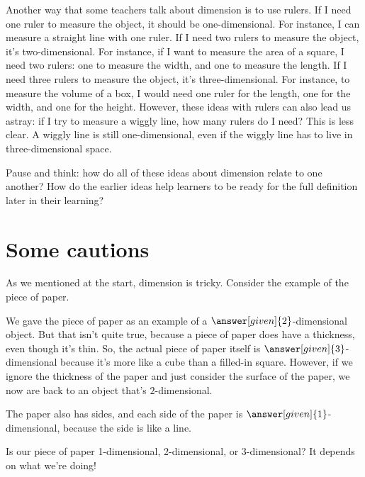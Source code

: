 \documentclass{ximera}
\begin{document}
Another way that some teachers talk about dimension is to use rulers. If I need one ruler to measure the object, it should be one-dimensional. For instance, I can measure a straight line with one ruler. If I need two rulers to measure the object, it's two-dimensional. For instance, if I want to measure the area of a square, I need two rulers: one to measure the width, and one to measure the length. If I need three rulers to measure the object, it's three-dimensional. For instance, to measure the volume of a box, I would need one ruler for the length, one for the width, and one for the height. However, these ideas with rulers can also lead us astray: if I try to measure a wiggly line, how many rulers do I need? This is less clear. A wiggly line is still one-dimensional, even if the wiggly line has to live in three-dimensional space.

\begin{question}
Pause and think: how do all of these ideas about dimension relate to one another? How do the earlier ideas help learners to be ready for the full definition later in their learning?
\begin{freeResponse}

\end{freeResponse}
\end{question}



\section{Some cautions}

As we mentioned at the start, dimension is tricky. Consider the example of the piece of paper.

\begin{example}
	We gave the piece of paper as an example of a $\answer[given]{2}$-dimensional object. But that isn't quite true, because a piece of paper does have a thickness, even though it's thin. So, the actual piece of paper itself is $\answer[given]{3}$-dimensional because it's more like a cube than a filled-in square. However, if we ignore the thickness of the paper and just consider the surface of the paper, we now are back to an object that's $2$-dimensional. 
	
	The paper also has sides, and each side of the paper is $\answer[given]{1}$-dimensional, because the side is like a line. 
	
	Is our piece of paper 1-dimensional, 2-dimensional, or 3-dimensional? It depends on what we're doing!
\end{example}
\end{document}
